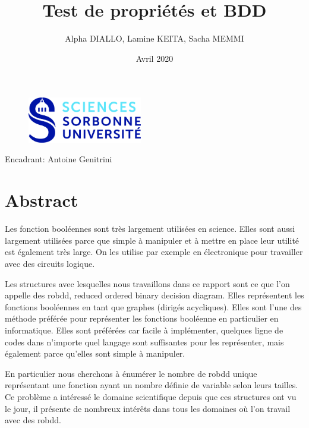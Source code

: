 \documentclass[french]{article}
\title{Test de propriétés et BDD}
\author{Alpha DIALLO, Lamine KEITA, Sacha MEMMI}
\date{Avril 2020}
\begin{document}
\maketitle
\begin{figure}[htp]
    \centering
    \includegraphics[width=5cm, height=2cm]{logo_upmc}
    \label{fig:logo}
\end{figure}

\begin{large}
\begin{center}
    Encadrant: Antoine Genitrini
\end{center}
\vfill
\begin{flushright}
\medskip

\medskip

\medskip

\end{flushright}
\end{large}


\newpage
\tableofcontents
\newpage
\section{Abstract}


Les fonction booléennes sont très largement utilisées en science. Elles sont aussi largement utilisées parce que simple à manipuler et à mettre en place leur utilité est également très large. On les utilise par exemple en électronique pour travailler avec des circuits logique.
\vspace{5mm} 

Les structures avec lesquelles nous travaillons dans ce rapport sont ce que l'on appelle des robdd, reduced ordered binary decision diagram. Elles représentent les fonctions booléennes en tant que graphes (dirigés acycliques). Elles sont l'une des méthode préférée pour représenter les fonctions booléenne en particulier en informatique. Elles sont préférées car facile à implémenter, quelques ligne de codes dans n'importe quel langage sont suffisantes pour les représenter, mais également parce qu'elles sont simple à manipuler.
\vspace{5mm} 

En particulier nous cherchons à énumérer le nombre de robdd unique représentant une fonction ayant un nombre définie de variable selon leurs tailles. Ce problème a intéressé le domaine scientifique depuis que ces structures ont vu le jour, il présente de nombreux intérêts dans tous les domaines où l'on travail avec des robdd.
\vspace{5mm} 
\end{document}
